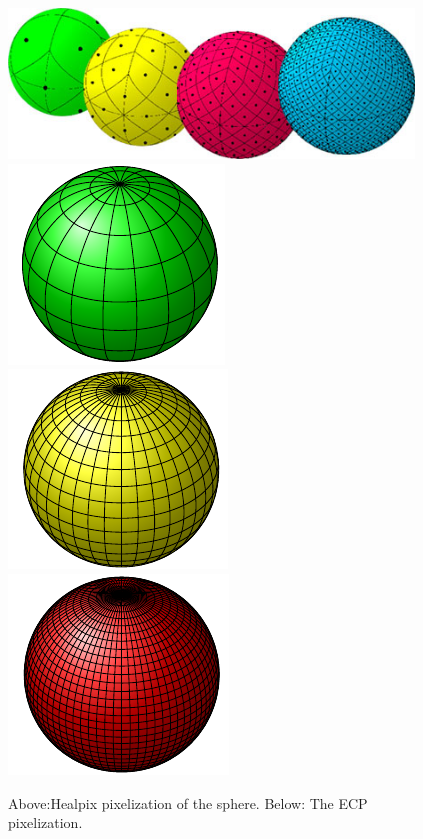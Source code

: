 \documentclass[12pt]{article}
\begin{document}
\begin{figure}[ht]
   \centering
      \includegraphics[height=4cm,width=10.78cm,angle=0]{healpixGridRefinement.jpg} \\
      \includegraphics[]{cylindrical-f1.pdf}
      \includegraphics[]{cylindrical-f2.pdf}
      \includegraphics[]{cylindrical-f3.pdf}
   \caption{Above:Healpix pixelization of the sphere. Below: The ECP pixelization.}
   \label{healpix}
\end{figure}
\end{document}
